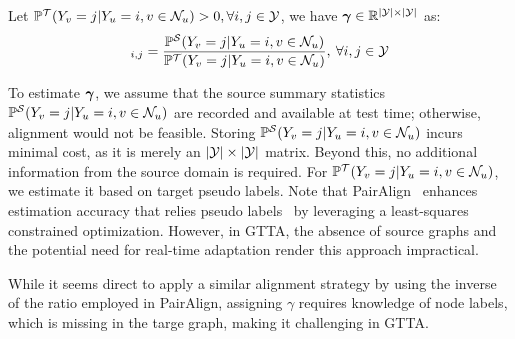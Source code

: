 


\begin{definition}
Let $\mathbb{P}^\mathcal{T}(Y_v=j|Y_u=i,v\in \mathcal{N}_u)>0, \forall i,j \in {\mathcal{Y}}$, we have $\boldsymbol{\gamma} \in \mathbb{R}^{|{\mathcal{Y}}|\times|{\mathcal{Y}}|}$ as:
\begin{equation} 
    [\mgamma]_{i,j} = \frac{\probs(Y_v=j|Y_u=i,v\in \neighbor_u)}{\probt(Y_v=j|Y_u=i,v\in \neighbor_u)}, \: \forall i,j \in \gY
\label{eq:gamma_ratio}
\end{equation}
\end{definition}
\vspace{-2mm}

To estimate $\boldsymbol{\gamma}$, we assume that the source summary statistics $\mathbb{P}^\mathcal{S}(Y_v=j|Y_u=i,v\in \mathcal{N}_u)$ are recorded and available at test time; otherwise, alignment would not be feasible. Storing  $\mathbb{P}^\mathcal{S}(Y_v=j|Y_u=i,v\in \mathcal{N}_u)$ incurs minimal cost, as it is merely an $|{\mathcal{Y}}|\times|{\mathcal{Y}}|$ matrix. Beyond this, no additional information from the source domain is required. For $\mathbb{P}^\mathcal{T}(Y_v=j|Y_u=i,v\in \mathcal{N}_u)$, we estimate it based on target pseudo labels. Note that PairAlign~\cite{liu2024pairwise} enhances estimation accuracy that relies pseudo labels~\cite{liu2023structural} by leveraging a least-squares constrained optimization. However, in GTTA, the absence of source graphs and the potential need for real-time adaptation render this approach impractical.




While it seems direct to apply a similar alignment strategy by using the inverse of the ratio employed in PairAlign, assigning $\gamma$ requires knowledge of node labels, which is missing in the targe graph, making it challenging in GTTA.


